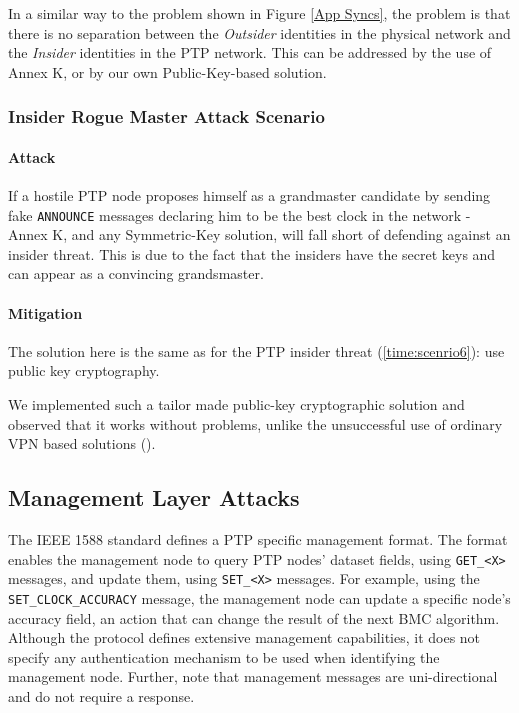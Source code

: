\documentclass[11pt]{article}
\begin{document}
In a similar way to the problem shown in Figure \ref{App Syncs}, the problem is that there is no separation between the \emph{Outsider} identities in the physical network and the \emph{Insider} identities in the PTP network. This can be addressed by the use of Annex K, or by our own Public-Key-based solution.



\subsubsection{Insider Rogue Master Attack Scenario}\label{bmc:scenrio2}

\paragraph{Attack}

If a hostile PTP node proposes himself as a grandmaster candidate by sending fake \texttt{ANNOUNCE} messages declaring him to be the best clock in the network - Annex K, and any Symmetric-Key solution, will fall short of defending against an insider threat. This is due to the fact that the insiders have the secret keys and can appear as a convincing grandsmaster.



\paragraph{Mitigation}\label{bmc:scenrio2mit}

The solution here is the same as for the PTP insider threat (\ref{time:scenrio6}): use public key cryptography.



We implemented such a tailor made public-key cryptographic solution and observed that it works without problems, unlike the unsuccessful use of ordinary VPN based solutions (\cite{nokia}).





\subsection{Management Layer Attacks}\label{attack:management}



The IEEE 1588 standard \cite{standard} defines a PTP specific management format. The format enables the management node to query PTP nodes' dataset fields, using \texttt{GET_<X>} messages, and update them, using \texttt{SET_<X>} messages. For example, using the \texttt{SET_CLOCK_ACCURACY} message, the management node can update a specific node's accuracy field, an action that can change the result of the next BMC algorithm. Although the protocol defines extensive management capabilities, it does not specify any authentication mechanism to be used when identifying the management node. Further, note that management messages are uni-directional and do not require a response.
\end{document}
